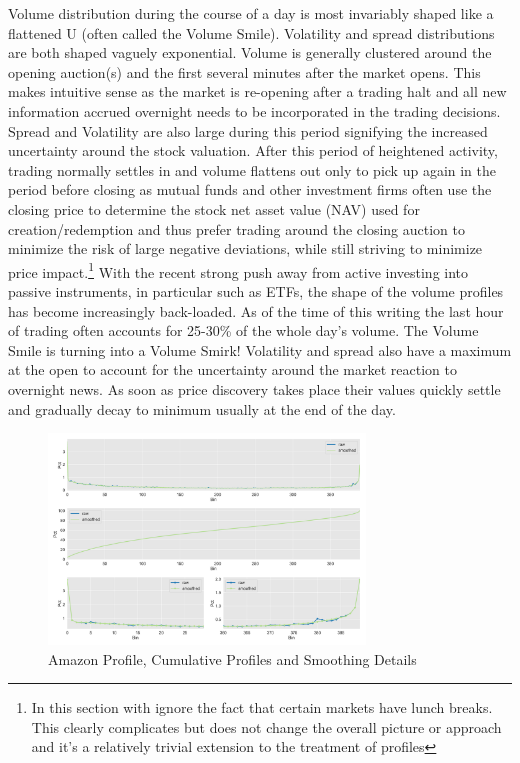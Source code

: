 Volume distribution during the course of a day is most invariably shaped like a flattened U (often called the Volume Smile). Volatility and spread distributions are both shaped vaguely exponential. Volume is generally clustered around the opening auction(s) and the first several minutes after the market opens. This makes intuitive sense as the market is re-opening after a trading halt and all new information accrued overnight needs to be incorporated in the trading decisions. Spread and Volatility are also large during this period signifying the increased uncertainty around the stock valuation. After this period of heightened activity,  trading normally settles in and volume flattens out only to pick up again in the period before closing as mutual funds and other investment firms often use the closing price to determine the stock net asset value (NAV) used for creation/redemption and thus prefer trading around the closing auction to minimize the risk of large negative deviations, while still striving to minimize price impact.\footnote{In this section with ignore the fact that certain markets have lunch breaks. This clearly complicates but does not change the overall picture or approach and it's a relatively trivial extension to the treatment of profiles} With the recent strong push away from active investing into passive instruments, in particular such as ETFs, the shape of the volume profiles has become increasingly back-loaded. As of the time of this writing the last hour of trading often accounts for 25-30\% of the whole day's volume. The Volume Smile is turning into a Volume Smirk! Volatility and spread also have a maximum at the open to account for the uncertainty around the market reaction to  overnight news. As soon as price discovery takes place their values quickly settle and gradually decay to minimum usually at the end of the day. \twomedskip

\begin{figure}[!ht]
		\centering
			\includegraphics[width=0.75\textwidth]{chapters/chapter_trade_data_models/figures/amzn_profile.png} 
		\caption{Amazon Profile, Cumulative Profiles and Smoothing Details\label{fig:adv}}
\end{figure}

